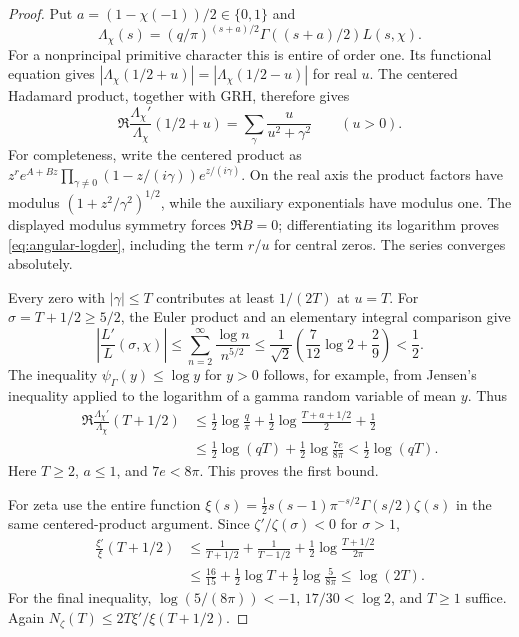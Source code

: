 \begin{proof}
Put $a=(1-\chi(-1))/2\in\{0,1\}$ and
\[
 \Lambda_\chi(s)=(q/\pi)^{(s+a)/2}
                    \Gamma((s+a)/2)L(s,\chi).
\]
For a nonprincipal primitive character this is entire of order one.  Its
functional equation gives
$|\Lambda_\chi(1/2+u)|=|\Lambda_\chi(1/2-u)|$ for real $u$.
The centered Hadamard product, together with GRH, therefore gives
\begin{equation}\label{eq:angular-logder}
 \Re\frac{\Lambda_\chi'}{\Lambda_\chi}(1/2+u)
       =\sum_\gamma\frac{u}{u^2+\gamma^2}\qquad(u>0).
\end{equation}
For completeness, write the centered product as
$z^r e^{A+Bz}\prod_{\gamma\ne0}(1-z/(i\gamma))e^{z/(i\gamma)}$.
On the real axis the product factors have modulus
$(1+z^2/\gamma^2)^{1/2}$, while the auxiliary exponentials have modulus one.
The displayed modulus symmetry forces $\Re B=0$; differentiating its
logarithm proves \eqref{eq:angular-logder}, including the term $r/u$ for
central zeros.  The series converges absolutely.

Every zero with $|\gamma|\le T$ contributes at least $1/(2T)$ at $u=T$.
For $\sigma=T+1/2\ge5/2$, the Euler product and an elementary integral
comparison give
\[
 \left|\frac{L'}{L}(\sigma,\chi)\right|
 \le\sum_{n=2}^\infty\frac{\log n}{n^{5/2}}
 \le\frac1{\sqrt2}\left(\frac7{12}\log2+\frac29\right)<\frac12.
\]
The inequality $\psi_\Gamma(y)\le\log y$ for $y>0$ follows, for example,
from Jensen's inequality applied to the logarithm of a gamma random variable
of mean $y$.  Thus
\begin{align*}
 \Re\frac{\Lambda_\chi'}{\Lambda_\chi}(T+1/2)
 &\le\frac12\log\frac q\pi
       +\frac12\log\frac{T+a+1/2}{2}+\frac12\\
 &\le\frac12\log(qT)
       +\frac12\log\frac{7e}{8\pi}
 <\frac12\log(qT).
\end{align*}
Here $T\ge2$, $a\le1$, and $7e<8\pi$.  This proves the first bound.

For zeta use the entire function
$\xi(s)=\tfrac12s(s-1)\pi^{-s/2}\Gamma(s/2)\zeta(s)$ in the same
centered-product argument.  Since $\zeta'/\zeta(\sigma)<0$ for $\sigma>1$,
\begin{align*}
 \frac{\xi'}{\xi}(T+1/2)
 &\le\frac1{T+1/2}+\frac1{T-1/2}
          +\frac12\log\frac{T+1/2}{2\pi}\\
 &\le\frac{16}{15}+\frac12\log T
          +\frac12\log\frac5{8\pi}
 \le\log(2T).
\end{align*}
For the final inequality, $\log(5/(8\pi))<-1$,
$17/30<\log2$, and $T\ge1$ suffice.  Again
$N_\zeta(T)\le2T\xi'/\xi(T+1/2)$.
\end{proof}

